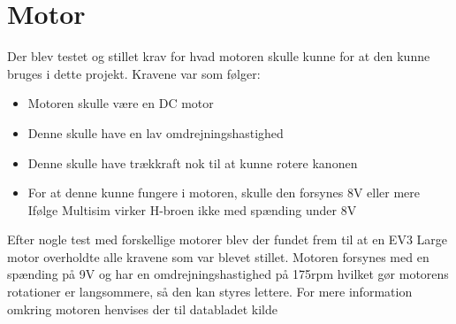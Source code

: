 \section{Motor}
Der blev testet og stillet krav for hvad motoren skulle kunne for at den kunne bruges i dette projekt. 
Kravene var som følger:
	\begin{itemize}
		\item	Motoren skulle være en DC motor
		\item   Denne skulle have en lav omdrejningshastighed
		\item	Denne skulle have trækkraft nok til at kunne rotere kanonen
		\item	For at denne kunne fungere i motoren, skulle den forsynes 8V eller mere 
		\subitem Ifølge Multisim virker H-broen ikke med spænding under 8V
	\end{itemize}
Efter nogle test med forskellige motorer blev der fundet frem til at en EV3 Large motor \cite{legoMotor} overholdte alle kravene som var blevet stillet. Motoren forsynes med en spænding på 9V og har en omdrejningshastighed på 175rpm hvilket gør motorens rotationer er langsommere, så den kan styres lettere. For mere information omkring motoren henvises der til databladet kilde \cite{legoMotor}